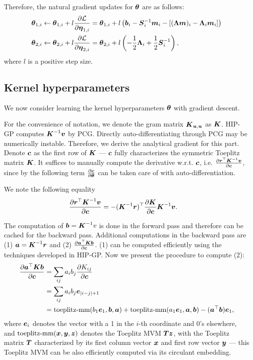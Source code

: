 Therefore, the natural gradient updates for ${\boldsymbol{\theta}}$ are as follows:
\begin{align}
  {\boldsymbol{\theta}}_{1,i} &\leftarrow {\boldsymbol{\theta}}_{1,i} + l \frac{\partial \mathcal{L}}{ \partial \boldsymbol{\eta}_{1,i}}
   = {\boldsymbol{\theta}}_{1,i} + l \left( \boldsymbol{b}_i -\boldsymbol{S}_i^{-1}\boldsymbol{m}_i - [({\boldsymbol{\Lambda}} \boldsymbol{m} )_i - {\boldsymbol{\Lambda}}_i \boldsymbol{m}_i ] \right)   \\
  {\boldsymbol{\theta}}_{2,i} & \leftarrow {\boldsymbol{\theta}}_{2,i} + l \frac{\partial \mathcal{L}}{\partial \boldsymbol{\eta}_{2,i}}
  = {\boldsymbol{\theta}}_{2,i} + l \left(  -\frac{1}{2}{\boldsymbol{\Lambda}}_i + \frac{1}{2}\boldsymbol{S}_i^{-1} \right),
\end{align}
where $l$ is a positive step size.

\subsection{Kernel hyperparameters}
We now consider learning the kernel hyperparameters ${\boldsymbol{\theta}}$ with gradient descent.

For the convenience of notation, we denote the gram matrix $\boldsymbol{K}_{\boldsymbol{u}, \boldsymbol{u}}$ as $\boldsymbol{K}$.
HIP-GP computes $\boldsymbol{K}^{-1} \boldsymbol{v}$ by PCG. 
Directly auto-differentiating through PCG may be numerically instable.
Therefore, we derive the analytical gradient for this part.
Denote $\boldsymbol{c}$ as the first row of $\boldsymbol{K}$ --- $\boldsymbol{c}$ fully characterizes the symmetric Toeplitz matrix $\boldsymbol{K}$.
It suffices to manually compute the derivative w.r.t. $\boldsymbol{c}$, i.e.
 $\frac{\partial \boldsymbol{r}^\top \boldsymbol{K}^{-1} \boldsymbol{v} }{ \partial \boldsymbol{c}}$,
since by the following term $\frac{\partial \boldsymbol{c}}{\partial {\boldsymbol{\theta}}}$ can be taken care of with auto-differentiation.


We note the following equality
\begin{align}
 \frac{\partial \boldsymbol{r}^\top \boldsymbol{K}^{-1} \boldsymbol{v} }{ \partial \boldsymbol{c}}
  &= -  (\boldsymbol{K}^{-1} \boldsymbol{r})^\top \frac{\partial \boldsymbol{K}}{ \partial \boldsymbol{c}} \boldsymbol{K}^{-1} \boldsymbol{v}.
\end{align}

The computation of $\boldsymbol{b} = \boldsymbol{K}^{-1}v$ is done in the forward pass and therefore can be cached for the backward pass.
Additional computations in the backward pass are (1) $\boldsymbol{a} = \boldsymbol{K}^{-1} \boldsymbol{r}$ and
 (2) $\frac{ \partial \boldsymbol{a}^\top  \boldsymbol{K} \boldsymbol{b}}{ \partial \boldsymbol{c} }$. (1) can be computed efficiently
 using the techniques developed in HIP-GP.
Now we present the procedure to compute (2):
\begin{align}
  \frac{\partial \boldsymbol{a}^\top \boldsymbol{K} \boldsymbol{b}}{\partial \boldsymbol{c}}  &= \sum_{ij} a_i b_j \frac{\partial K_{ij}}{\partial \boldsymbol{c}} \\
  &= \sum_{ij} a_i b_j  \boldsymbol{e}_{|i-j|+1} \\
&= \textrm{toeplitz-mm} (b_1 \boldsymbol{e}_1, \boldsymbol{b}, \boldsymbol{a}) + \textrm{toeplitz-mm} (a_1\boldsymbol{e}_1, \boldsymbol{a}, \boldsymbol{b}) - (\boldsymbol{a}^\top \boldsymbol{b}) \boldsymbol{e}_1,
\end{align}
where $\boldsymbol{e}_{i}$ denotes the vector with a 1 in the $i$-th coordinate and 0's elsewhere,
and $\textrm{toeplitz-mm}(\boldsymbol{x},\boldsymbol{y},\boldsymbol{z})$ denotes the Toeplitz MVM $\boldsymbol{T} \boldsymbol{z}$, with the
Toeplitz matrix $\boldsymbol{T}$ characterized by its first column vector $\boldsymbol{x}$ and first row vector $\boldsymbol{y}$
--- this Toeplitz MVM can be also efficiently computed via its circulant embedding.


